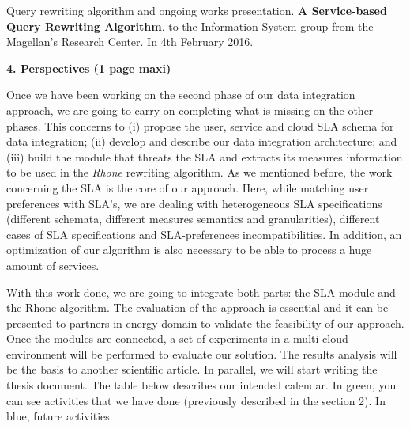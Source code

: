 \documentclass[11pt,a4paper,oneside]{report}
\begin{document}
\noindent
Query rewriting algorithm and ongoing works presentation. \textbf{A Service-based Query Rewriting Algorithm}. to the Information System group from the Magellan’s Research Center. In 4th February 2016.

\newpage
\begin{flushleft}
\textbf{4. Perspectives (1 page maxi)}\\
\end{flushleft}

Once we have been working on the second phase of our data integration approach, we are going to carry on completing what is missing on the other phases. This concerns to (i) propose the user, service and cloud SLA schema for data integration; (ii) develop and describe our data integration architecture; and (iii) build the module that threats the SLA and extracts its measures information to be used in the \textit{Rhone} rewriting algorithm. As we mentioned before, the work concerning the SLA is the core of our approach. Here, while matching user preferences with SLA's, we are dealing with heterogeneous SLA specifications (different schemata, different measures semantics and granularities), different cases of  SLA specifications and SLA-preferences incompatibilities. In addition, an optimization of our algorithm is also necessary to be able to process a huge amount of services.

With this work done, we are going to integrate both parts: the SLA module and the Rhone algorithm. The evaluation of the approach is essential and it can be presented to partners in energy domain to validate the feasibility of our approach. Once the modules are connected, a set of experiments in a multi-cloud environment will be performed to evaluate our solution. The results analysis will be the basis to another scientific article. In parallel, we will start writing the thesis document. The table below describes our intended calendar. In green, you can see activities that we have done (previously described in the section 2). In blue, future activities.
\end{document}
